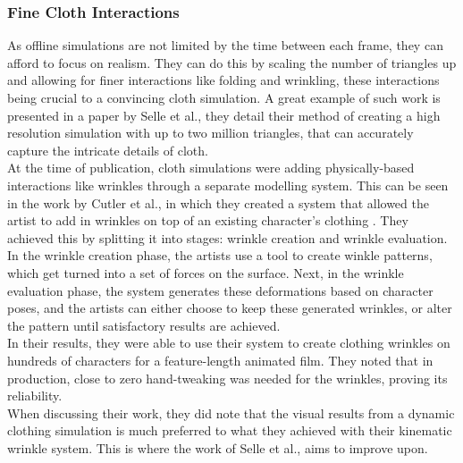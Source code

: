 \documentclass[12pt,a4paper]{article}
\begin{document}
\subsubsection{Fine Cloth Interactions}
As offline simulations are not limited by the time between each frame, they can afford to focus on realism. They can do this by scaling the number of triangles up and allowing for finer interactions like folding and wrinkling, these interactions being crucial to a convincing cloth simulation. A great example of such work is presented in a paper by Selle et al., they detail their method of creating a high resolution simulation with up to two million triangles, that can accurately capture the intricate details of cloth. \cite{4522545}\\

At the time of publication, cloth simulations were adding physically-based interactions like wrinkles through a separate modelling system. This can be seen in the work by Cutler et al., in which they created a system that allowed the artist to add in wrinkles on top of an existing character's clothing \cite{10.1145/1073368.1073384}. They achieved this by splitting it into stages: wrinkle creation and wrinkle evaluation. In the wrinkle creation phase, the artists use a tool to create winkle patterns, which get turned into a set of forces on the surface. Next, in the wrinkle evaluation phase, the system generates these deformations based on character poses, and the artists can either choose to keep these generated wrinkles, or alter the pattern until satisfactory results are achieved.\\
In their results, they were able to use their system to create clothing wrinkles on hundreds of characters for a feature-length animated film. They noted that in production, close to zero hand-tweaking was needed for the wrinkles, proving its reliability.\\
When discussing their work, they did note that the visual results from a dynamic clothing simulation is much preferred to what they achieved with their kinematic wrinkle system. This is where the work of Selle et al., aims to improve upon. \\
\end{document}
